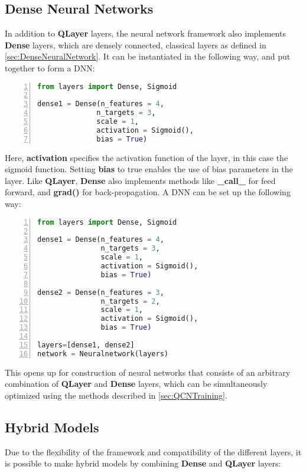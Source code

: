 \subsection{Dense Neural Networks}\label{sec:DNNs}
In addition to \textbf{QLayer} layers, the neural network framework also implements \textbf{Dense} layers, which are densely connected, classical layers as defined in \cref{sec:DenseNeuralNetwork}. It can be instantiated in the following way, and put together to form a DNN:

\begin{lstlisting}[language=python, numbers=left]
from layers import Dense, Sigmoid

dense1 = Dense(n_features = 4,
              n_targets = 3,
              scale = 1,
              activation = Sigmoid(),
              bias = True)
\end{lstlisting}
Here, \textbf{activation} specifies the activation function of the layer, in this case the sigmoid function. Setting \textbf{bias} to true enables the use of bias parameters in the layer. Like \textbf{QLayer}, \textbf{Dense} also implements methods like \textbf{\_call\_} for feed forward, and \textbf{grad()} for back-propagation. A DNN can be set up the following way:

\begin{lstlisting}[language=python, numbers=left]
from layers import Dense, Sigmoid

dense1 = Dense(n_features = 4,
               n_targets = 3,
               scale = 1,
               activation = Sigmoid(),
               bias = True)
               
dense2 = Dense(n_features = 3,
               n_targets = 2,
               scale = 1,
               activation = Sigmoid(),
               bias = True)
               
layers=[dense1, dense2]       
network = Neuralnetwork(layers)
\end{lstlisting}

This opens up for construction of neural networks that consists of an arbitrary combination of \textbf{QLayer} and \textbf{Dense} layers, which can be simultaneously optimized using the methods described in \cref{sec:QCNTraining}.

\subsection{Hybrid Models}\label{sec:Hybrid Models}
Due to the flexibility of the framework and compatibility of the different layers, it is possible to make hybrid models by combining \textbf{Dense} and \textbf{QLayer} layers:

